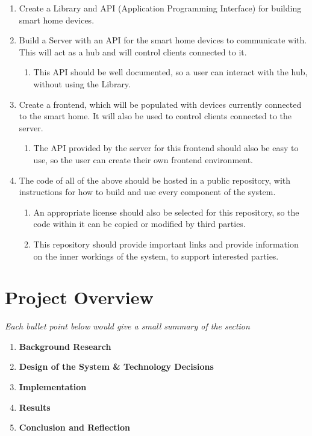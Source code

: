 \begin{enumerate}
    \item Create a Library and API (Application Programming Interface) for 
        building smart home devices.
    \item Build a Server with an API for the smart home devices to communicate 
        with. This will act as a hub and will control clients connected to it.
         \begin{enumerate}
             \item This API should be well documented, so a user can interact 
                 with the hub, without using the Library.
         \end{enumerate}
     \item Create a frontend, which will be populated with devices currently 
         connected to the smart home. It will also be used to control clients 
         connected to the server.
         \begin{enumerate}
             \item The API provided by the server for this frontend should also 
                 be easy to use, so the user can create their own frontend 
                 environment.
         \end{enumerate}
     \item The code of all of the above should be hosted in a public repository, 
         with instructions for how to build and use every component of the 
         system.
         \begin{enumerate}
             \item An appropriate license should also be selected for this 
                 repository, so the code within it can be copied or modified by 
                 third parties.
             \item This repository should provide important links and provide 
                 information on the inner workings of the system, to support 
                 interested parties.
         \end{enumerate}
\end{enumerate}
    
\section{Project Overview} \label{sec:intro:overview} 
\textit{Each bullet point below would give a small summary of the section}
\begin{enumerate}
    \item \textbf{Background Research} 
    \item \textbf{Design of the System \& Technology Decisions}
    \item \textbf{Implementation}
    \item \textbf{Results}
    \item \textbf{Conclusion and Reflection}
\end{enumerate}
